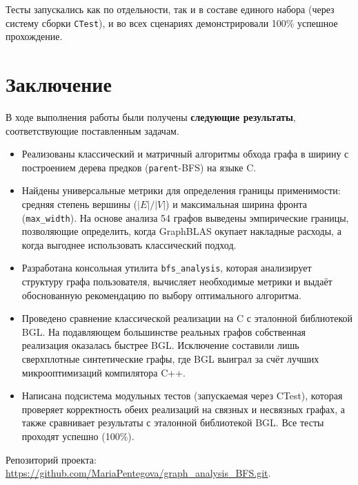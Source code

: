 \documentclass[a4paper]{article}
\begin{document}
Тесты запускались как по отдельности, так и в составе единого набора (через систему сборки \texttt{CTest}), и во всех сценариях демонстрировали 100\% успешное прохождение.

\section*{Заключение}

В ходе выполнения работы были получены \textbf{следующие результаты}, соответствующие поставленным задачам.

\begin{itemize}
    \item Реализованы классический и матричный алгоритмы обхода графа в ширину с построением дерева предков (\texttt{parent}-BFS) на языке C.

    \item Найдены универсальные метрики для определения границы применимости: средняя степень вершины (\(|E|/|V|\)) и максимальная ширина фронта (\texttt{max\_width}). На основе анализа 54 графов выведены эмпирические границы, позволяющие определить, когда GraphBLAS окупает накладные расходы, а когда выгоднее использовать классический подход.

    \item Разработана консольная утилита \texttt{bfs\_analysis}, которая анализирует структуру графа пользователя, вычисляет необходимые метрики и выдаёт обоснованную рекомендацию по выбору оптимального алгоритма.

    \item Проведено сравнение классической реализации на C с эталонной библиотекой BGL. На подавляющем большинстве реальных графов собственная реализация оказалась быстрее BGL. Исключение составили лишь сверхплотные синтетические графы, где BGL выиграл за счёт лучших микрооптимизаций компилятора C++.

    \item Написана подсистема модульных тестов (запускаемая через CTest), которая проверяет корректность обеих реализаций на связных и несвязных графах, а также сравнивает результаты с эталонной библиотекой BGL. Все тесты проходят успешно (100\%).
\end{itemize}

Репозиторий проекта: \url{https://github.com/MariaPentegova/graph_analysis_BFS.git}.
\end{document}
